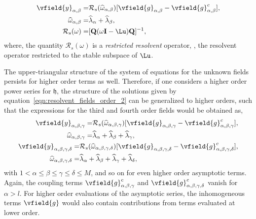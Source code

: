 	\begin{align}
	\label{eqn:resolvent_fields_order_2}
	\begin{split}
		\vfield{y}_{\alpha,\beta} =&  \mathcal{R}_{s}(\widehat{\omega}_{\alpha,\beta})[\vfield{g}_{\alpha,\beta} - \vfield{g}^{c}_{\alpha,\beta}], \\
		\widehat{\omega}_{\alpha,\beta} =& \widehat{\lambda}_{\alpha} + \widehat{\lambda}_{\beta}, \\
		\mathcal{R}_{s}(\omega) =& [\mathbf{Q}(\omega\mathbf{I} 
		- \Lu)\mathbf{Q}]^{-1},
	\end{split}
\end{align}
where, the quantity $\mathcal{R}_{s}(\omega)$ is a \emph{restricted resolvent} operator, \ie, the resolvent operator restricted to the stable subspace of $\Lu$. 

The upper-triangular structure of the system of equations for the unknown fields persists for higher order terms as well. Therefore, if one considers a higher order power series for $\mathfrak{h}$, the structure of the solutions given by equation~\eqref{eqn:resolvent_fields_order_2} can be generalized to higher orders, such that the expressions for the third and fourth order fields would be obtained as,
\begin{subequations}
	\label{eqn:resolvent_fields_higher_order}
	\begin{align}
		\label{eqn:resolvent_fields_order_3}
		\begin{split}
			\vfield{y}_{\alpha,\beta,\gamma} =&  	\mathcal{R}_{s}(\widehat{\omega}_{\alpha,\beta,\gamma})[\vfield{g}_{\alpha,\beta,\gamma} - \vfield{g}^{c}_{\alpha,\beta,\gamma}], \\
			\widehat{\omega}_{\alpha,\beta,\gamma} =& \widehat{\lambda}_{\alpha} + 	\widehat{\lambda}_{\beta} + \widehat{\lambda}_{\gamma},
		\end{split}  \\ 
		\label{eqn:resolvent_fields_order_4}
		\begin{split}
			\vfield{y}_{\alpha,\beta,\gamma,\delta} =&  	\mathcal{R}_{s}(\widehat{\omega}_{\alpha,\beta,\gamma,\delta})[\vfield{g}_{\alpha,\beta,\gamma,\delta} - \vfield{g}^{c}_{\alpha,\beta,\gamma,\delta}], \\
			\widehat{\omega}_{\alpha,\beta,\gamma,\delta} =& \widehat{\lambda}_{\alpha} + 	\widehat{\lambda}_{\beta} + \widehat{\lambda}_{\gamma} + \widehat{\lambda}_{\delta},
		\end{split}
	\end{align}
\end{subequations}
with $1<\alpha\le\beta\le\gamma\le\delta\le M$, and so on for even higher order asymptotic terms. Again, the coupling terms $\vfield{g}^{c}_{\alpha,\beta,\gamma}$ and $\vfield{g}^{c}_{\alpha,\beta,\gamma,\delta}$ vanish for $\alpha > l$. For higher order evaluations of the asymptotic series, the inhomogeneous terms $\vfield{g}$ would also contain contributions from terms evaluated at lower order. 


